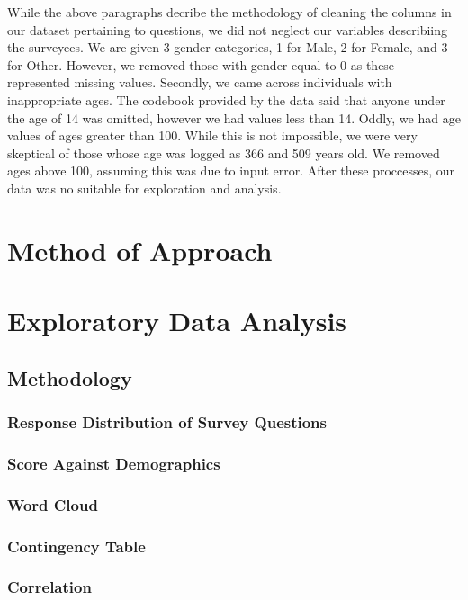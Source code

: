\documentclass{article}
\begin{document}
While the above paragraphs decribe the methodology of cleaning the columns in our dataset pertaining to questions, we did not neglect our variables describiing the surveyees. We are given 3 gender categories, 1 for Male, 2 for Female, and 3 for Other. However, we removed those with gender equal to 0 as these represented missing values. Secondly, we came across individuals with inappropriate ages. The codebook provided by the data said that anyone under the age of 14 was omitted, however we had values less than 14. Oddly, we had age values of ages greater than 100. While this is not impossible, we were very skeptical of those whose age was logged as 366 and 509 years old. We removed ages above 100, assuming this was due to input error. After these proccesses, our data was no suitable for exploration and analysis. 

\section{Method of Approach}

\newpage
\section{Exploratory Data Analysis}

\subsection{Methodology}

\subsubsection{Response Distribution of Survey Questions}

\subsubsection{Score Against Demographics}

\subsubsection{Word Cloud}

\subsubsection{Contingency Table}

\subsubsection{Correlation}
\end{document}
